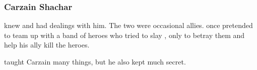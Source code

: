 \subsubsection{Carzain Shachar}

 knew \ZeethanKraal and had dealings with him. 
The two were occasional allies.
\Shachar once pretended to team up with a band of heroes who tried to slay \Kraal, only to betray them and help his ally \Kraal kill the heroes.

\Kraal taught Carzain many things, but he also kept much secret. 






























